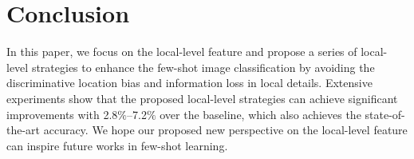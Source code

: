 \documentclass{article}
\begin{document}
\begin{table}[h]
    \small
	\setlength{\abovecaptionskip}{0.0cm}
	\setlength{\abovecaptionskip}{0.0cm}
	\setlength{\belowcaptionskip}{0.1cm}
\end{table}











\section{Conclusion}
In this paper, we focus on the local-level feature and propose a series of local-level strategies to enhance the few-shot image classification by avoiding the discriminative location bias and information loss in local details. Extensive experiments show that the proposed local-level strategies can achieve significant improvements with 2.8$\%$–7.2$\%$ over the baseline, which also achieves the state-of-the-art accuracy. We hope our proposed new perspective on the local-level feature can inspire future works in few-shot learning.
\end{document}
